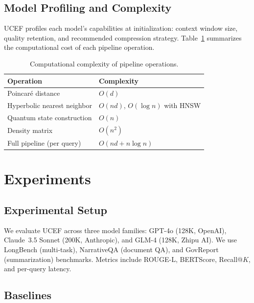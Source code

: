 \documentclass[journal]{IEEEtran}
\newcommand{\ucef}{\textsf{UCEF}}
\begin{document}
\subsection{Model Profiling and Complexity}

\ucef{} profiles each model's capabilities at initialization:
context window size, quality retention, and recommended compression
strategy.  Table~\ref{tab:complexity} summarizes the computational cost of
each pipeline operation.

\begin{table}[t]
\caption{Computational complexity of pipeline operations.}
\label{tab:complexity}
\centering
\small
\begin{tabular}{@{}ll@{}}
\toprule
Operation & Complexity \\
\midrule
Poincar\'{e} distance      & $O(d)$ \\
Hyperbolic nearest neighbor & $O(nd)$, $O(\log n)$ with HNSW \\
Quantum state construction  & $O(n)$ \\
Density matrix              & $O(n^{2})$ \\
Full pipeline (per query)   & $O(nd + n\log n)$ \\
\bottomrule
\end{tabular}
\end{table}


\section{Experiments}
\label{sec:experiments}

\subsection{Experimental Setup}

We evaluate \ucef{} across three model families:
GPT-4o (128K, OpenAI), Claude~3.5 Sonnet (200K, Anthropic),
and GLM-4 (128K, Zhipu AI).
We use LongBench (multi-task), NarrativeQA (document QA), and GovReport
(summarization) benchmarks.  Metrics include ROUGE-L, BERTScore,
Recall@$K$, and per-query latency.

\subsection{Baselines}
\end{document}
